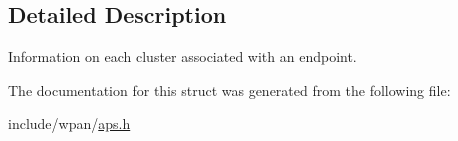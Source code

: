 \subsection{Detailed Description}
Information on each cluster associated with an endpoint. 

The documentation for this struct was generated from the following file\-:\begin{DoxyCompactItemize}
\item 
include/wpan/\hyperlink{aps_8h}{aps.\-h}\end{DoxyCompactItemize}
